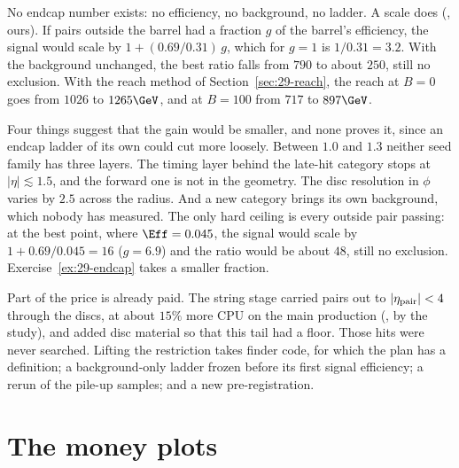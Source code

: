 \begin{example}\label{exa:29-endcap}
No endcap number exists: no efficiency, no background, no ladder. A scale does (\EST, ours). If pairs outside the barrel had a fraction $g$ of the barrel's efficiency, the signal would scale by $1+(0.69/0.31)\,g$, which for $g=1$ is $1/0.31=3.2$. With the background unchanged, the best ratio falls from $790$ to about $250$, still no exclusion. With the reach method of Section~\ref{sec:29-reach}, the reach at $B=0$ goes from $1026$ to $1265\GeV$, and at $B=100$ from $717$ to $897\GeV$.

Four things suggest that the gain would be smaller, and none proves it, since an endcap ladder of its own could cut more loosely. Between $1.0$ and $1.3$ neither seed family has three layers. The timing layer behind the late-hit category stops at $|\eta|\lesssim1.5$, and the forward one is not in the geometry. The disc resolution in $\phi$ varies by $2.5$ across the radius. And a new category brings its own background, which nobody has measured. The only hard ceiling is every outside pair passing: at the best point, where $\Eff=0.045$, the signal would scale by $1+0.69/0.045=16$ ($g=6.9$) and the ratio would be about $48$, still no exclusion. Exercise~\ref{ex:29-endcap} takes a smaller fraction.
\end{example}

Part of the price is already paid. The string stage carried pairs out to $|\eta_{\rm pair}|<4$ through the discs, at about $15\%$ more CPU on the main production (\EST, by the study), and added disc material so that this tail had a floor. Those hits were never searched. Lifting the restriction takes finder code, for which the plan has a definition; a background-only ladder frozen before its first signal efficiency; a rerun of the pile-up samples; and a new pre-registration.

\section{The money plots}\label{sec:29-money}

